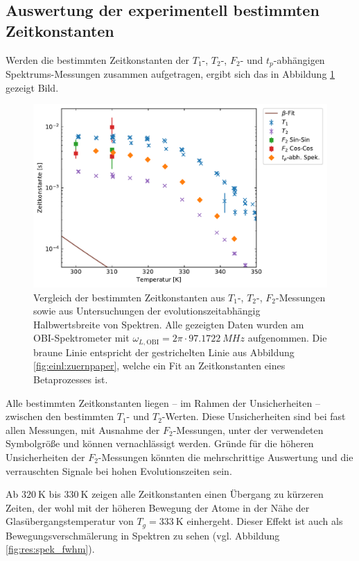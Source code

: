 \subsection{Auswertung der experimentell bestimmten Zeitkonstanten} \label{section:res:dynausw}

Werden die bestimmten Zeitkonstanten der $T_1$-, $T_2$-, $F_2$- und $t_p$-abhängigen Spek\-trums-Mess\-un\-gen zusammen aufgetragen, ergibt sich das in Abbildung \ref{fig:res:dynvgl} gezeigt Bild.
\begin{figure}
	\begin{center}
		\includegraphics[width=.9\textwidth]{graphics/plot/dyn.pdf}
	\end{center}
	\caption{Vergleich der bestimmten Zeitkonstanten aus $T_1$-, $T_2$-, $F_2$-Messungen sowie aus Untersuchungen der evolutionszeitabhängig Halbwertsbreite von Spektren. Alle gezeigten Daten wurden am OBI-Spektrometer mit $\omega_{L, \text{OBI}} = 2\pi \cdot \SI{97.1722}{MHz}$ aufgenommen. Die braune Linie entspricht der gestrichelten Linie aus Abbildung \ref{fig:einl:zuernpaper}, welche ein Fit an Zeitkonstanten eines Betaprozesses ist.} \label{fig:res:dynvgl}
\end{figure}
Alle bestimmten Zeitkonstanten liegen -- im Rahmen der Unsicherheiten -- zwischen den bestimmten $T_1$- und $T_2$-Werten. Diese Unsicherheiten sind bei fast allen Messungen, mit Ausnahme der $F_2$-Messungen, unter der verwendeten Symbolgröße und können vernachlässigt werden. Gründe für die höheren Unsicherheiten der $F_2$-Messungen könnten die mehrschrittige Auswertung und die verrauschten Signale bei hohen Evolutionszeiten sein.

Ab $\SI{320}{\kelvin}$ bis $\SI{330}{\kelvin}$ zeigen alle Zeitkonstanten einen Übergang zu kürzeren Zeiten, der wohl mit der höheren Bewegung der Atome in der Nähe der Glasübergangstemperatur von $T_g = \SI{333}{\kelvin}$ einhergeht. Dieser Effekt ist auch als Bewegungsverschmälerung in Spektren zu sehen (vgl. Abbildung \ref{fig:res:spek_fwhm}).

